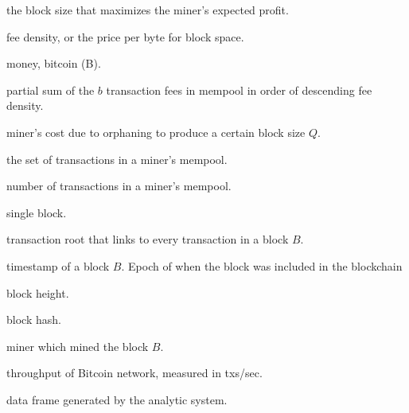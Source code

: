 \documentclass[USenglish]{uit-thesis}
\def\bitcoin{\leavevmode\rlap{\hskip.5pt-}B}
\begin{document}
\begin{appendices}
\begin{description}[leftmargin=!, labelwidth=\widthof{\bfseries $M_{demand}(b)$ }]
	\item [$Q^*$] the block size that maximizes the miner’s expected profit.
	\item [$\rho$] fee density, or the price per byte for block space.
	\item [$M$] money, bitcoin (\bitcoin).
	\item [$M_{demand}(b)$] partial sum of the $b$ transaction fees
	in mempool in order of descending fee density.
	\item [$M_{supply}(Q)$] miner’s cost due to orphaning to produce a certain block size $Q$.
	\item [$\mathcal{N}$] the set of transactions in a miner’s mempool.
	\item [$n$] number of transactions in a miner’s mempool.
	\item [$B$] single block.
	\item [$B_t$] transaction root that links to every transaction in a block $B$.
	\item [$B_{epoch}$] timestamp of a block $B$.
	Epoch of when the block was included in the blockchain
	\item [$B_h$] block height.
	\item [$B_{ha}$] block hash.
	\item [$B_{mi}$] miner which mined the block $B$.
	\item [$\gamma$] throughput of Bitcoin network, measured in txs/sec.
	\item [$\delta$] data frame generated by the analytic system.
\end{description}


\end{appendices}
\end{document}
